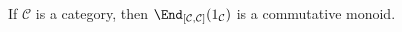 If $\mathcal{C}$ is a category, then $\End_{[\mathcal{C}, \mathcal{C}]}(1_{\mathcal{C}})$
is a commutative monoid.
